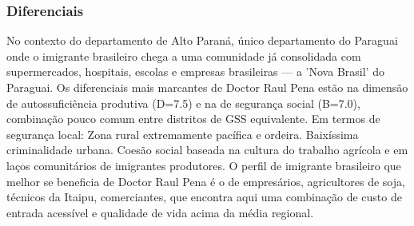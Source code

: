 \subsubsection*{Diferenciais}\label{dif-doctor-raul-pena-1003}
No contexto do departamento de Alto Paraná, único departamento do Paraguai onde o imigrante brasileiro chega a uma comunidade já consolidada com supermercados, hospitais, escolas e empresas brasileiras — a 'Nova Brasil' do Paraguai. Os diferenciais mais marcantes de Doctor Raul Pena estão na dimensão de autossuficiência produtiva (D=7.5) e na de segurança social (B=7.0), combinação pouco comum entre distritos de GSS equivalente. Em termos de segurança local: Zona rural extremamente pacífica e ordeira. Baixíssima criminalidade urbana. Coesão social baseada na cultura do trabalho agrícola e em laços comunitários de imigrantes produtores. O perfil de imigrante brasileiro que melhor se beneficia de Doctor Raul Pena é o de empresários, agricultores de soja, técnicos da Itaipu, comerciantes, que encontra aqui uma combinação de custo de entrada acessível e qualidade de vida acima da média regional.
